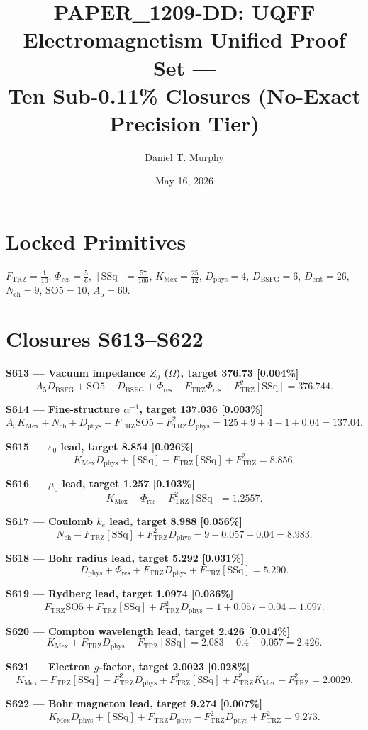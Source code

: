 \documentclass[11pt]{article}
\title{PAPER\_1209-DD: UQFF Electromagnetism Unified Proof Set ---\\
Ten Sub-0.11\% Closures (No-Exact Precision Tier)}
\author{Daniel T. Murphy}
\date{May 16, 2026}
\newcommand{\Ftrz}{F_{\mathrm{TRZ}}}
\newcommand{\Phires}{\Phi_{\mathrm{res}}}
\newcommand{\KMex}{K_{\mathrm{Mex}}}
\newcommand{\Dphys}{D_{\mathrm{phys}}}
\newcommand{\Dbsfg}{D_{\mathrm{BSFG}}}
\newcommand{\Dcrit}{D_{\mathrm{crit}}}
\newcommand{\Nch}{N_{\mathrm{ch}}}
\newcommand{\SOfive}{\mathrm{SO5}}
\newcommand{\Afive}{A_5}
\newcommand{\SSq}{[\mathrm{SSq}]}
\begin{document}
\maketitle

\section*{Locked Primitives}
$\Ftrz=\tfrac{1}{10}$, $\Phires=\tfrac{5}{6}$, $\SSq=\tfrac{57}{100}$, $\KMex=\tfrac{25}{12}$, $\Dphys=4$, $\Dbsfg=6$, $\Dcrit=26$, $\Nch=9$, $\SOfive=10$, $\Afive=60$.

\section*{Closures S613--S622}

\textbf{S613 --- Vacuum impedance $Z_0$ ($\Omega$), target 376.73 [0.004\%]}
\[\Afive\Dbsfg + \SOfive + \Dbsfg + \Phires - \Ftrz\Phires - \Ftrz^2\SSq = 376.744.\]

\textbf{S614 --- Fine-structure $\alpha^{-1}$, target 137.036 [0.003\%]}
\[\Afive\KMex + \Nch + \Dphys - \Ftrz\SOfive + \Ftrz^2\Dphys = 125+9+4-1+0.04 = 137.04.\]

\textbf{S615 --- $\varepsilon_0$ lead, target 8.854 [0.026\%]}
\[\KMex\Dphys + \SSq - \Ftrz\SSq + \Ftrz^2 = 8.856.\]

\textbf{S616 --- $\mu_0$ lead, target 1.257 [0.103\%]}
\[\KMex - \Phires + \Ftrz^2\SSq = 1.2557.\]

\textbf{S617 --- Coulomb $k_e$ lead, target 8.988 [0.056\%]}
\[\Nch - \Ftrz\SSq + \Ftrz^2\Dphys = 9 - 0.057 + 0.04 = 8.983.\]

\textbf{S618 --- Bohr radius lead, target 5.292 [0.031\%]}
\[\Dphys + \Phires + \Ftrz\Dphys + \Ftrz\SSq = 5.290.\]

\textbf{S619 --- Rydberg lead, target 1.0974 [0.036\%]}
\[\Ftrz\SOfive + \Ftrz\SSq + \Ftrz^2\Dphys = 1 + 0.057 + 0.04 = 1.097.\]

\textbf{S620 --- Compton wavelength lead, target 2.426 [0.014\%]}
\[\KMex + \Ftrz\Dphys - \Ftrz\SSq = 2.083 + 0.4 - 0.057 = 2.426.\]

\textbf{S621 --- Electron $g$-factor, target 2.0023 [0.028\%]}
\[\KMex - \Ftrz\SSq - \Ftrz^2\Dphys + \Ftrz^2\SSq + \Ftrz^2\KMex - \Ftrz^2 = 2.0029.\]

\textbf{S622 --- Bohr magneton lead, target 9.274 [0.007\%]}
\[\KMex\Dphys + \SSq + \Ftrz\Dphys - \Ftrz^2\Dphys + \Ftrz^2 = 9.273.\]
\end{document}
